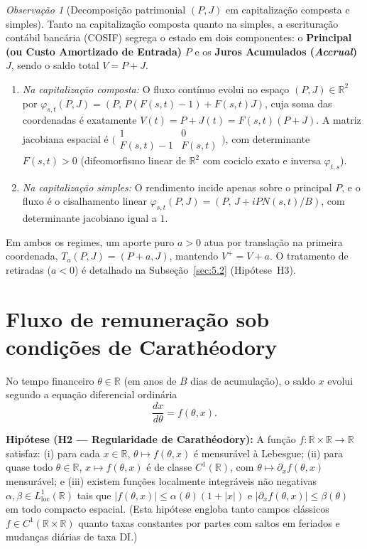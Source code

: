 \documentclass[11pt, a4paper]{article}
\theoremstyle{definition}
\theoremstyle{plain}
\theoremstyle{remark}
\newtheorem{observacao}[definicao]{Observação}
\begin{document}
\begin{observacao}[Decomposição patrimonial $(P, J)$ em capitalização composta e simples]\label{obs:2.8}
Tanto na capitalização composta quanto na simples, a escrituração contábil bancária (COSIF) segrega o estado em dois componentes: o \textbf{Principal (ou Custo Amortizado de Entrada)} $P$ e os \textbf{Juros Acumulados (\emph{Accrual})} $J$, sendo o saldo total $V = P + J$.
\begin{enumerate}[label=(\alph*)]
    \item \emph{Na capitalização composta:} O fluxo contínuo evolui no espaço $(P, J) \in \mathbb{R}^2$ por $\varphi_{s,t}(P, J) = (P,\, P(F(s,t)-1) + F(s,t)J)$, cuja soma das coordenadas é exatamente $V(t) = P + J(t) = F(s,t)(P + J)$. A matriz jacobiana espacial é $\Big(\begin{smallmatrix} 1 & 0 \\ F(s,t)-1 & F(s,t) \end{smallmatrix}\Big)$, com determinante $F(s,t) > 0$ (difeomorfismo linear de $\mathbb{R}^2$ com cociclo exato e inversa $\varphi_{t,s}$).
    \item \emph{Na capitalização simples:} O rendimento incide apenas sobre o principal $P$, e o fluxo é o cisalhamento linear $\varphi_{s,t}(P, J) = (P,\, J + i P N(s,t)/B)$, com determinante jacobiano igual a $1$.
\end{enumerate}
Em ambos os regimes, um aporte puro $a > 0$ atua por translação na primeira coordenada, $T_a(P, J) = (P + a, J)$, mantendo $V^+ = V + a$. O tratamento de retiradas ($a < 0$) é detalhado na Subseção~\ref{sec:5.2} (Hipótese~H3).
\end{observacao}

\section{Fluxo de remuneração sob condições de Carathéodory}\label{sec:3}

No tempo financeiro $\theta \in \mathbb{R}$ (em anos de $B$ dias de acumulação), o saldo $x$ evolui segundo a equação diferencial ordinária
\begin{equation}\label{eq:edo}
\frac{dx}{d\theta} = f(\theta, x).
\end{equation}

\noindent\textbf{Hipótese (H2 — Regularidade de Carathéodory):} A função $f : \mathbb{R} \times \mathbb{R} \to \mathbb{R}$ satisfaz: (i) para cada $x \in \mathbb{R}$, $\theta \mapsto f(\theta, x)$ é mensurável à Lebesgue; (ii) para quase todo $\theta \in \mathbb{R}$, $x \mapsto f(\theta, x)$ é de classe $C^1(\mathbb{R})$, com $\theta \mapsto \partial_x f(\theta, x)$ mensurável; e (iii) existem funções localmente integráveis não negativas $\alpha, \beta \in L^1_{\text{loc}}(\mathbb{R})$ tais que $|f(\theta, x)| \le \alpha(\theta)(1 + |x|)$ e $|\partial_x f(\theta, x)| \le \beta(\theta)$ em todo compacto espacial. (Esta hipótese engloba tanto campos clássicos $f \in C^1(\mathbb{R} \times \mathbb{R})$ quanto taxas constantes por partes com saltos em feriados e mudanças diárias de taxa DI.)
\end{document}
